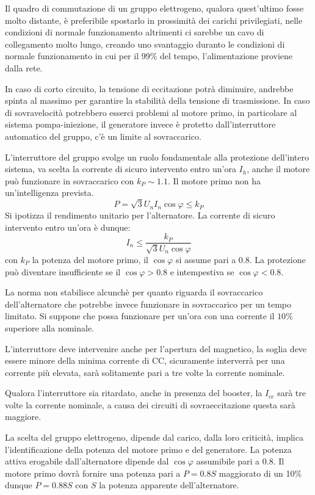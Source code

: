 
Il quadro di commutazione di un gruppo elettrogeno, qualora quest'ultimo fosse molto distante, è preferibile spostarlo in 
prossimità dei carichi privilegiati, nelle condizioni di normale funzionamento 
altrimenti ci sarebbe un cavo di collegamento molto lungo, creando uno 
svantaggio duranto le condizioni di normale funzionamento in cui per il 99\% 
del tempo, l'alimentazione proviene dalla rete.

In caso di corto circuito, la tensione di eccitazione potrà diminuire, andrebbe 
spinta al massimo per garantire la stabilità della tensione di trasmissione.
In caso di sovravelocità potrebbero esserci problemi al motore primo, in 
particolare al sistema pompa-iniezione, il generatore invece è protetto 
dall'interruttore automatico del gruppo, c'è un limite al sovraccarico.

L'interruttore del gruppo svolge un ruolo fondamentale alla protezione 
dell'intero sistema, va scelta la corrente di sicuro intervento entro un'ora 
$I_h$, anche il motore può funzionare in sovraccarico con $k_P \sim 1.1$. 
Il motore primo non ha un'intelligenza prevista.
$$
P = \sqrt{3}U_n I_n \cos\varphi \leq k_P
$$
Si ipotizza il rendimento unitario per l'alternatore.
La corrente di sicuro intervento entro un'ora è dunque:
$$
I_n \leq \frac{k_P}{\sqrt{3} U_n \cos \varphi}
$$
con $k_P$ la potenza del motore primo, il $\cos\varphi$ si assume pari a 0.8.
La protezione può diventare insufficiente se il $\cos\varphi>0.8$ e intempestiva se $\cos\varphi<0.8$.

La norma non stabilisce alcunchè per quanto riguarda il sovraccarico 
dell'alternatore che potrebbe invece funzionare in sovraccarico per un tempo 
limitato. Si suppone che possa funzionare per un'ora con una corrente il $10\%$ 
superiore alla nominale.

L'interruttore deve intervenire anche per l'apertura del magnetico, la soglia 
deve essere minore della minima corrente di CC, sicuramente interverrà per una 
corrente più elevata, sarà solitamente pari a tre volte la corrente nominale.

Qualora l'interruttore sia ritardato, anche in presenza del booster, la $I_{cc}$
sarà tre volte la corrente nominale, a causa dei circuiti di sovraeccitazione
questa sarà maggiore.

La scelta del gruppo elettrogeno, dipende dal carico, dalla loro criticità, 
implica l'identificazione della potenza del motore primo e del generatore.
La potenza attiva erogabile dall'alternatore dipende dal $\cos\varphi$ 
assumibile pari a 0.8. Il motore primo dovrà fornire una potenza pari a 
$P=0.8S$ maggiorato di un 10\% dunque $P=0.88S$ con $S$ la potenza apparente 
dell'alternatore.

